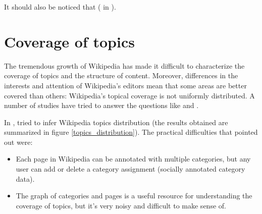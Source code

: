         It should also be noticed that  (\citeauthor{Halavais} in \cite{Halavais}).
    \section{Coverage of topics}
        The tremendous growth of Wikipedia has made it difficult to characterize the coverage of topics and the structure of content. Moreover, differences in the interests and attention of Wikipedia's editors mean that some areas are better covered than others: Wikipedia's topical coverage is not uniformly distributed. A number of studies have tried to answer the questions like  and .
        
        In \citeyear{Kittur}, \citeauthor{Kittur} tried to infer Wikipedia topics distribution \cite{Kittur} (the results obtained are summarized in figure \ref{topics_distribution}). The practical difficulties that \citeauthor{Kittur} pointed out were:
        \begin{itemize}
            \item Each page in Wikipedia can be annotated with multiple categories, but any user can add or delete a category assignment (socially annotated category data).
            \item The graph of categories and pages is a useful resource for understanding the coverage of topics, but it's very noisy and difficult to make sense of.
        \end{itemize}
        
        
        
